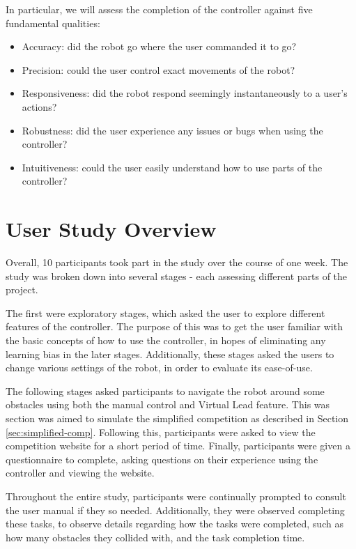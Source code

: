 \documentclass{l4proj}
\begin{document}
In particular, we will assess the completion of the controller against five fundamental qualities:
\begin{itemize}
    \item Accuracy: did the robot go where the user commanded it to go?
    \item Precision: could the user control exact movements of the robot?
    \item Responsiveness: did the robot respond seemingly instantaneously to a user's actions?
    \item Robustness: did the user experience any issues or bugs when using the controller?
    \item Intuitiveness: could the user easily understand how to use parts of the controller?
\end{itemize}


\section{User Study Overview}
Overall, 10 participants took part in the study over the course of one week. The study was broken down into several stages - each assessing different parts of the project. 

The first were exploratory stages, which asked the user to explore different features of the controller. The purpose of this was to get the user familiar with the basic concepts of how to use the controller, in hopes of eliminating any learning bias in the later stages. Additionally, these stages asked the users to change various settings of the robot, in order to evaluate its ease-of-use.

The following stages asked participants to navigate the robot around some obstacles using both the manual control and Virtual Lead feature. This was section was aimed to simulate the simplified competition as described in Section \ref{sec:simplified-comp}. Following this, participants were asked to view the competition website for a short period of time. Finally, participants were given a questionnaire to complete, asking questions on their experience using the controller and viewing the website.
 
Throughout the entire study, participants were continually prompted to consult the user manual if they so needed. Additionally, they were observed completing these tasks, to observe details regarding how the tasks were completed, such as how many obstacles they collided with, and the task completion time.
\end{document}
